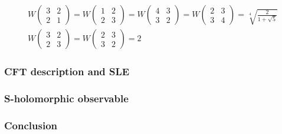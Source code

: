 \documentclass[pdftex]{beamer}
\theoremstyle{definition} \newtheorem{Def}{Definition}
\begin{document}
\begin{frame}
\begin{equation}
\begin{array}{l}
         W\left(                                       
           \begin{array}{cc}
             3 & 2 \\
             2 & 1
           \end{array}
         \right)=
         W\left(                                                       
           \begin{array}{cc}
             1 & 2 \\
             2 & 3
           \end{array}
         \right)=    W\left(                                                      
           \begin{array}{cc}
             4 & 3 \\
             3 & 2
           \end{array}
         \right)=
         W\left(                                                        
           \begin{array}{cc}
             2 & 3 \\
             3 & 4
           \end{array}
         \right)=
         \sqrt[4]{\frac{2}{1+\sqrt{5}}}\\
         W\left(
           \begin{array}{cc}
             3 & 2 \\
             2 & 3
           \end{array}
         \right)=    W\left(
           \begin{array}{cc}
             2 & 3 \\
             3 & 2
           \end{array}
         \right)=2 
       \end{array}
     \end{equation}
   \end{frame}
   
  \begin{frame}
    \frametitle{ CFT description and SLE }
  \end{frame}
  \begin{frame}
    \frametitle{ S-holomorphic observable}
  \end{frame}
  \begin{frame}
    \frametitle{ Conclusion}
  \end{frame}
{} 
  
\end{document}
